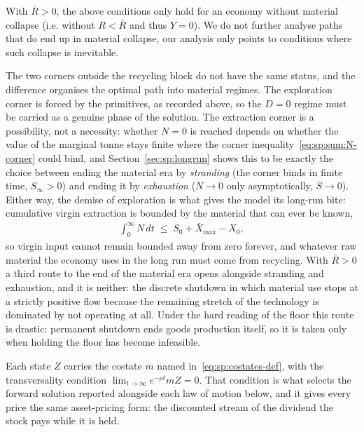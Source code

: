  With $\bar{R}>0$, the above conditions only hold for an economy without material collapse (i.e. without $R<\bar{R}$ and thus $Y= 0$). We do not further analyse paths that do end up in material collapse, our analysis only points to conditions where such collapse is inevitable. 


 The two corners outside the recycling block do not have the same
status, and the difference organises the optimal path into material regimes. The exploration corner
is forced by the primitives, as recorded above, so the $D=0$ regime must be carried as a genuine
phase of the solution. The extraction corner is a possibility, not a necessity: whether $N=0$ is
reached depends on whether the value of the marginal tonne stays finite where the corner
inequality~\eqref{eq:sp:sum:N-corner} could bind, and Section~\ref{sec:sp:longrun} shows this to be
exactly the choice between ending the material era by \emph{stranding} (the corner binds in finite
time, $S_\infty>0$) and ending it by \emph{exhaustion} ($N\to0$ only asymptotically, $S\to0$).
Either way, the demise of exploration is what gives the model its long-run bite: cumulative virgin
extraction is bounded by the material that can ever be known,
\begin{align}
\int_0^\infty N\,dt \;\le\; S_0+\bar X_{\max}-X_0,
\label{eq:sp:sum:cumulative-N}
\end{align}
so virgin input cannot remain bounded away from zero forever, and whatever raw material the economy
uses in the long run must come from recycling. With $\bar R>0$ a third route to the end of the material era opens alongside stranding and exhaustion, and it is neither: the discrete shutdown in which material use stops at a strictly positive flow because the remaining stretch of the technology is dominated by not operating at all. Under the hard reading of the floor this route is drastic: permanent shutdown ends goods production itself, so it is taken
only when holding the floor has become infeasible. 



 Each state $Z$ carries the costate $m$ named in~\eqref{eq:sp:costates-def}, with the transversality condition $\lim_{t\to\infty}e^{-\rho t}m Z=0$. That condition is what selects the forward solution reported alongside each law of motion below, and it gives every price the same asset-pricing form: the discounted stream of the dividend the stock pays while it is held.

